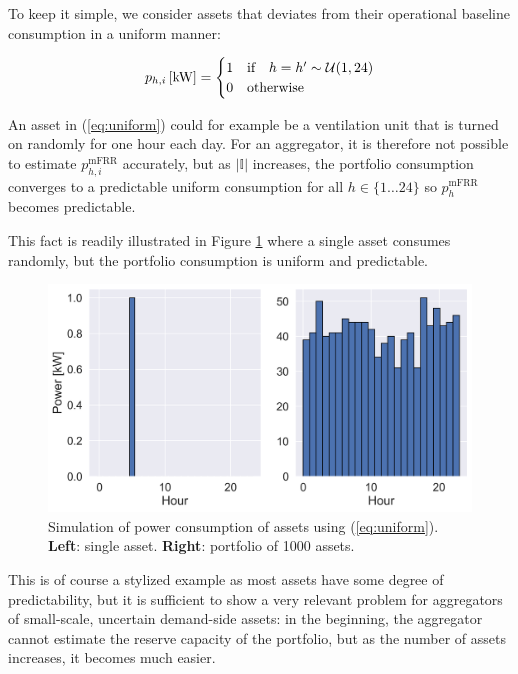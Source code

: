 \documentclass[lettersize,journal]{IEEEtran}
\begin{document}
To keep it simple, we consider assets that deviates from their operational baseline consumption in a uniform manner:

\begin{align}\label{eq:uniform}
    p_{h,i} \thinspace [\text{kW}] = \begin{cases}
                                         1 & \text{if} \quad h = h^{\prime} \sim \mathcal{U}(1,24) \\
                                         0 & \text{otherwise}
                                     \end{cases}
\end{align}

An asset in (\ref{eq:uniform}) could for example be a ventilation unit that is turned on randomly for one hour each day. For an aggregator, it is therefore not possible to estimate $p^{\text{mFRR}}_{h, i}$ accurately, but as $|\mathbb{I}|$ increases, the portfolio consumption converges to a predictable uniform consumption for all $h \in \{1 \hdots 24 \}$ so $p^{\text{mFRR}}_{h}$ becomes predictable.

This fact is readily illustrated in Figure \ref{fig:assets} where a single asset consumes randomly, but the portfolio consumption is uniform and predictable.

\begin{figure}[!t]
    \centering
    \includegraphics[width=\columnwidth]{figures/assets.png}
    \caption{Simulation of power consumption of assets using (\ref{eq:uniform}). \textbf{Left}: single asset. \textbf{Right}: portfolio of 1000 assets.}
    \label{fig:assets}
\end{figure}


This is of course a stylized example as most assets have some degree of predictability, but it is sufficient to show a very relevant problem for aggregators of small-scale, uncertain demand-side assets: in the beginning, the aggregator cannot estimate the reserve capacity of the portfolio, but as the number of assets increases, it becomes much easier.
\end{document}
